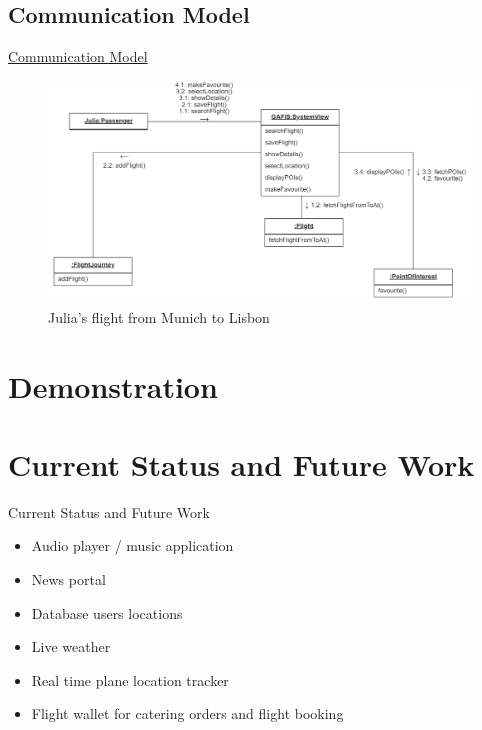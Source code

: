 \documentclass{beamer}
\begin{document}
\subsection{Communication Model}
\begin{frame}{\href{run:../images/ScenarioOneCommunication.png}{Communication Model}}
	\begin{figure}
		\includegraphics[width=.8\textwidth]{../images/ScenarioOneCommunication.png}
		\caption{Julia's flight from Munich to Lisbon}
	\end{figure}
\end{frame}
\section{Demonstration}
\section{Current Status and Future Work}
\begin{frame}{Current Status and Future Work}
	\begin{itemize}
		\item Audio player / music application
		\item News portal
		\item Database users locations
		\item Live weather
		\item Real time plane location tracker
		\item Flight wallet for catering orders and flight booking
	\end{itemize}
\end{frame}
\end{document}
